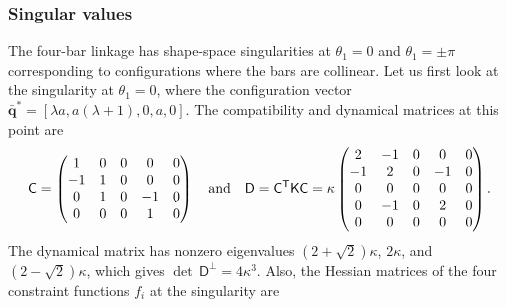 \subsubsection{Singular values}

The four-bar linkage has shape-space singularities at $\theta_1 = 0$ and $\theta_1 = \pm\pi$ corresponding to configurations where the bars are collinear.
Let us first look at the singularity at $\theta_1 = 0$, where the configuration vector $\bar{\bm{q}}^{*} = [\lambda a, a(\lambda + 1), 0, a, 0]$.
The compatibility and dynamical matrices at this point are
%
\begin{equation}
  \mathsf{C} =
  \begin{pmatrix}
  1  & 0 & 0 & 0  & 0 \\
  -1 & 1 & 0 & 0  & 0 \\
  0  & 1 & 0 & -1 & 0 \\
  0  & 0 & 0 & 1  & 0 \\
  \end{pmatrix}
  \quad\text{and}\quad
  \mathsf{D} = \mathsf{C}^\mathsf{T}\mathsf{K}\mathsf{C} = \kappa
  \begin{pmatrix}
    2  & -1 & 0 & 0  & 0 \\
    -1 & 2  & 0 & -1 & 0 \\
    0  & 0  & 0 & 0  & 0 \\
    0  & -1 & 0 & 2  & 0 \\
    0  & 0  & 0 & 0  & 0 \\
  \end{pmatrix}.
\end{equation}
%
The dynamical matrix has nonzero eigenvalues $(2+\sqrt{2})\kappa$, $2\kappa$, and $(2-\sqrt{2})\kappa$, which gives $\det\,\mathsf{D}^\perp = 4\kappa^3$.
Also, the Hessian matrices of the four constraint functions $f_i$ at the singularity are
%
